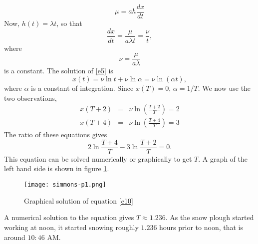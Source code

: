 \documentclass{article}
\begin{document}
\begin{enumerate}
\begin{equation}
\mu = ah\frac{dx}{dt}
\end{equation}
Now, $h(t) = \lambda t$, so that
\begin{equation}\label{e5}
\frac{dx}{dt} = \frac{\mu}{a\lambda t} = \frac{\nu}{t},
\end{equation}
where 
\begin{equation}\label{e6}
\nu = \frac{\mu}{a\lambda}
\end{equation}
is a constant. The solution of \eqref{e5} is
\begin{equation}\label{e7}
x(t) = \nu\ln t + \nu\ln\alpha = \nu\ln(\alpha t),
\end{equation}
where $\alpha$ is a constant of integration. Since $x(T) = 0$, $\alpha = 1/T$.
We now use the two observations,
\begin{eqnarray}
x(T + 2) &=& \nu\ln\left(\frac{T + 2}{T}\right) = 2 \label{e8} \\
x(T + 4) &=& \nu\ln\left(\frac{T + 4}{T}\right) = 3 \label{e9}
\end{eqnarray}
The ratio of these equations gives
\begin{equation}\label{e10}
2\ln\frac{T + 4}{T} - 3\ln\frac{T + 2}{T} = 0.
\end{equation}
This equation can be solved numerically or graphically to get $T$. A graph of
the left hand side is shown in figure \ref{f1}.
\begin{figure}
\centering
\texttt{[image: simmons-p1.png]}
\caption{Graphical solution of equation \eqref{e10}}
\label{f1}
\end{figure}
A numerical solution to the equation gives $T \approx 1.236$. As the snow 
plough started working at noon, it started snowing roughly $1.236$ hours prior
to noon, that is around $10:46$ AM.

\end{enumerate}
\end{document}
